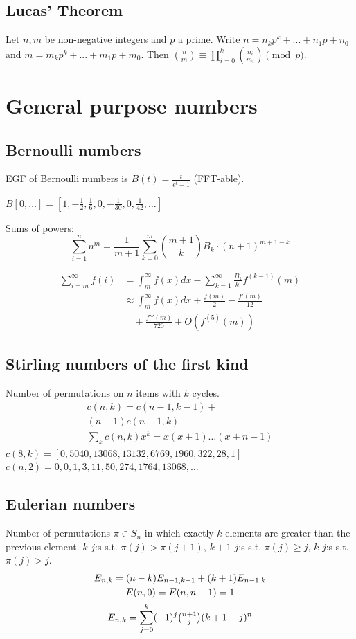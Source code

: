 	\subsection{Lucas' Theorem}
		Let $n,m$ be non-negative integers and $p$ a prime. Write $n=n_kp^k+...+n_1p+n_0$ and $m=m_kp^k+...+m_1p+m_0$. Then $\binom{n}{m} \equiv \prod_{i=0}^k\binom{n_i}{m_i} \pmod{p}$.


\section{General purpose numbers}
\subsection{Bernoulli numbers}
  EGF of Bernoulli numbers is $B(t)=\frac{t}{e^t-1}$ (FFT-able).
  \begin{center}
    {\footnotesize $B[0,\dots] = [1, -\frac{1}{2}, \frac{1}{6}, 0, -\frac{1}{30}, 0, \frac{1}{42}, \dots]$}
  \end{center}

		Sums of powers:
		\small
		\[ \sum_{i=1}^n n^m = \frac{1}{m+1} \sum_{k=0}^m \binom{m+1}{k} B_k \cdot (n+1)^{m+1-k} \]
		\normalsize

  \small
  \[
  \begin{aligned}
    \sum_{i=m}^{\infty} f(i) &= \int_m^\infty f(x) dx - \sum_{k=1}^\infty \frac{B_k}{k!}f^{(k-1)}(m) \\
    &\approx \int_{m}^\infty f(x)dx + \frac{f(m)}{2} - \frac{f'(m)}{12} \\
    &\quad + \frac{f'''(m)}{720} + O(f^{(5)}(m))
  \end{aligned}
  \]
  \normalsize

  \subsection{Stirling numbers of the first kind}
  Number of permutations on $n$ items with $k$ cycles.
  \begin{gather*}
    c(n,k) = c(n-1,k-1) +\\
    (n-1)c(n-1,k) \\
    \textstyle \sum_k c(n,k)x^k = x(x+1)\dots(x+n-1)
  \end{gather*}
  {\tiny $c(8,k) = [0, 5040, 13068, 13132, 6769, 1960, 322, 28, 1]$} \\
  {\tiny $c(n,2) = 0, 0, 1, 3, 11, 50, 274, 1764, 13068, \dots$}

  \subsection{Eulerian numbers}
  Number of permutations $\pi \in S_n$ in which exactly $k$ elements are greater than the previous element. $k$ $j$:s s.t. $\pi(j)>\pi(j+1)$, $k+1$ $j$:s s.t. $\pi(j)\geq j$, $k$ $j$:s s.t. $\pi(j)>j$.
  \begin{gather*}
    E_{n,k} = (n-k)E_{n-1,k-1} + (k+1)E_{n-1,k} \\
    E(n,0) = E(n,n-1) = 1 \\
    E_{n,k} = \sum_{j=0}^k (-1)^j \tbinom{n+1}{j} (k+1-j)^n
  \end{gather*}

